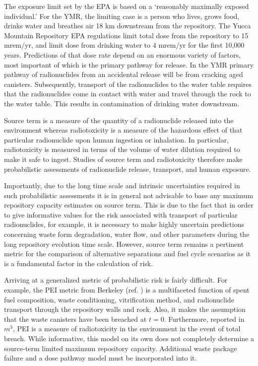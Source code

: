 The exposure limit set by the \gls{EPA} is based on a `reasonably maximally 
exposed individual.' For the \gls{YMR}, the limiting case is a person who lives, 
grows food, drinks water and breathes air 18 km downstream from the repository. 
The Yucca Mountain Repository \gls{EPA} regulations limit total dose from the 
repository to 15 mrem/yr, and limit dose from drinking water to 4 mrem/yr for 
the first 10,000 years. 
Predictions of that dose rate depend on an enormous variety of factors, most 
important of which is the primary pathway for release. In the \gls{YMR} primary 
pathway of radionuclides from an accidental release will be from cracking aged 
canisters. Subsequently, transport of the radionuclides to the water table 
requires that the radionuclides come in contact with water and travel through 
the rock to the water table. This results in contamination of drinking water 
downstream.  

Source term is a measure of the quantity of a radionuclide released into the 
environment whereas radiotoxicity is a measure of the hazardous effect of that 
particular radionuclide upon human ingestion or inhalation.  In particular, 
radiotoxicity is measured in terms of the volume of water dilution required to 
make it safe to ingest. Studies of source term and radiotoxicity therefore make 
probabilistic assessments of radionuclide release, transport, and human 
exposure.  

Importantly, due to the long time scale and intrinsic uncertainties required in 
such probabilistic assessments it is in general not advisable to base any 
maximum repository capacity estimates on source term. This is due to the fact 
that in order to give informative values for the risk associated with transport of 
particular radionuclides, for example, it is necessary to make highly uncertain  
predictions concerning waste form degradation, water flow, and other parameters 
during the long repository evolution time scale.  However, source term remains a 
pertinent metric for the comparison of alternative separations and fuel cycle
scenarios as it is a fundamental factor in the calculation of risk.

Arriving at a generalized metric of probabilistic risk is fairly difficult. For 
example, the \gls{PEI} metric from Berkeley (ref.  
\cite{bouvier_comparison_2007}) is a multifaceted function of spent fuel 
composition, waste conditioning, vitrification method, and radionuclide 
transport through the repository walls and rock.  Also, it makes the assumption 
that the waste canisters have been breached at $t=0$. Furthermore, reported in 
$m^3$, PEI is a measure of radiotoxicity in the environment in the event of 
total breach. While informative, this model on its own does not completely 
determine a source-term limited maximum repository capacity.  Additional waste 
package failure and a dose pathway model must be incorporated into it.


